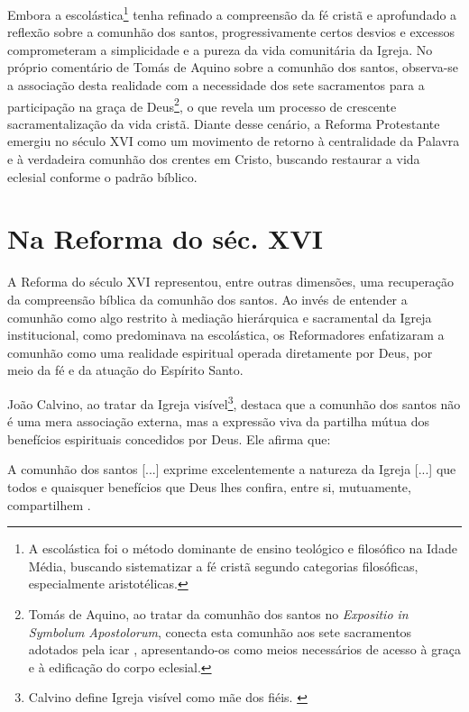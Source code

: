 Embora a escolástica\footnote{A escolástica foi o método dominante de ensino teológico e filosófico na Idade Média, buscando sistematizar a fé cristã segundo categorias filosóficas, especialmente aristotélicas.} tenha refinado a compreensão da fé cristã e aprofundado a reflexão sobre a comunhão dos santos, progressivamente certos desvios e excessos comprometeram a simplicidade e a pureza da vida comunitária da Igreja. No próprio comentário de Tomás de Aquino sobre a comunhão dos santos, observa-se a associação desta realidade com a necessidade dos sete sacramentos para a participação na graça de Deus\footnote{Tomás de Aquino, ao tratar da comunhão dos santos no \textit{\foreignlanguage{latin}{Expositio in Symbolum Apostolorum}}, conecta esta comunhão aos sete sacramentos adotados pela \gls{icar} \cite{aquinoCredo2004}, apresentando-os como meios necessários de acesso à graça e à edificação do corpo eclesial.}, o que revela um processo de crescente sacramentalização da vida cristã. Diante desse cenário, a Reforma Protestante emergiu no século XVI como um movimento de retorno à centralidade da Palavra e à verdadeira comunhão dos crentes em Cristo, buscando restaurar a vida eclesial conforme o padrão bíblico.

\section{Na Reforma do séc. XVI}

A Reforma do século XVI representou, entre outras dimensões, uma recuperação da compreensão bíblica da comunhão dos santos. Ao invés de entender a comunhão como algo restrito à mediação hierárquica e sacramental da Igreja institucional, como predominava na escolástica, os Reformadores enfatizaram a comunhão como uma realidade espiritual operada diretamente por Deus, por meio da fé e da atuação do Espírito Santo.

João Calvino, ao tratar da Igreja visível\footnote{Calvino define Igreja visível como mãe dos fiéis. \cite[v. 4, p. 1865]{calvino2022}}, destaca que a comunhão dos santos não é uma mera associação externa, mas a expressão viva da partilha mútua dos benefícios espirituais concedidos por Deus. Ele afirma que:
\begin{citacao}
A comunhão dos santos [...] exprime excelentemente a natureza da Igreja [...] que todos e quaisquer benefícios que Deus lhes confira, entre si, mutuamente, compartilhem \cite[v. 4, p. 1863]{calvino2022}.
\end{citacao}

